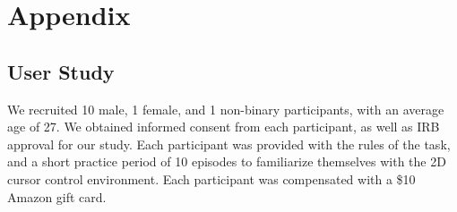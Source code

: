\documentclass{article}
\begin{document}
\section{Appendix}

\subsection{User Study} \label{study-details}

We recruited 10 male, 1 female, and 1 non-binary participants, with an average age of 27.
We obtained informed consent from each participant, as well as IRB approval for our study.
Each participant was provided with the rules of the task, and a short practice period of 10 episodes to familiarize themselves with the 2D cursor control environment.
Each participant was compensated with a \$10 Amazon gift card.
\end{document}
